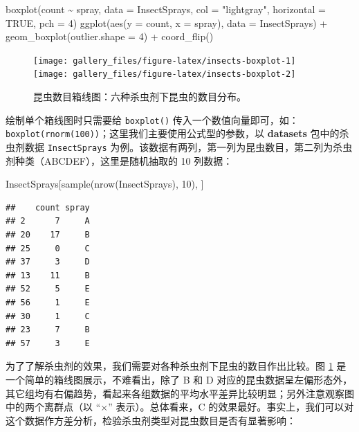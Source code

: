 \documentclass[
  b5paper,
  UTF8,twoside]{book}
\newenvironment{Shaded}{\begin{snugshade}}{\end{snugshade}}
\newcommand{\AttributeTok}[1]{\textcolor[rgb]{0.77,0.63,0.00}{#1}}
\newcommand{\ConstantTok}[1]{\textcolor[rgb]{0.00,0.00,0.00}{#1}}
\newcommand{\DecValTok}[1]{\textcolor[rgb]{0.00,0.00,0.81}{#1}}
\newcommand{\FunctionTok}[1]{\textcolor[rgb]{0.00,0.00,0.00}{#1}}
\newcommand{\NormalTok}[1]{#1}
\newcommand{\SpecialCharTok}[1]{\textcolor[rgb]{0.00,0.00,0.00}{#1}}
\newcommand{\StringTok}[1]{\textcolor[rgb]{0.31,0.60,0.02}{#1}}
\begin{document}
\begin{Shaded}
\begin{Highlighting}[]
\FunctionTok{boxplot}\NormalTok{(count }\SpecialCharTok{\textasciitilde{}}\NormalTok{ spray, }\AttributeTok{data =}\NormalTok{ InsectSprays,}
        \AttributeTok{col =} \StringTok{"lightgray"}\NormalTok{, }\AttributeTok{horizontal =} \ConstantTok{TRUE}\NormalTok{, }\AttributeTok{pch =} \DecValTok{4}\NormalTok{)}
\FunctionTok{ggplot}\NormalTok{(}\FunctionTok{aes}\NormalTok{(}\AttributeTok{y =}\NormalTok{ count, }\AttributeTok{x =}\NormalTok{ spray), }\AttributeTok{data =}\NormalTok{ InsectSprays) }\SpecialCharTok{+}
  \FunctionTok{geom\_boxplot}\NormalTok{(}\AttributeTok{outlier.shape =} \DecValTok{4}\NormalTok{) }\SpecialCharTok{+}
  \FunctionTok{coord\_flip}\NormalTok{()}
\end{Highlighting}
\end{Shaded}

\begin{figure}

{\centering \texttt{[image: gallery\_files/figure-latex/insects-boxplot-1]} \texttt{[image: gallery\_files/figure-latex/insects-boxplot-2]} 

}

\caption[各种杀虫剂下昆虫数目的箱线图]{昆虫数目箱线图：六种杀虫剂下昆虫的数目分布。}\label{fig:insects-boxplot}
\end{figure}

绘制单个箱线图时只需要给 \texttt{boxplot()} 传入一个数值向量即可，如：\texttt{boxplot(rnorm(100))}；这里我们主要使用公式型的参数，以 \textbf{datasets} 包中的杀虫剂数据 \texttt{InsectSprays} 为例。该数据有两列，第一列为昆虫数目，第二列为杀虫剂种类（ABCDEF），这里是随机抽取的 10 列数据：

\begin{Shaded}
\begin{Highlighting}[]
\NormalTok{InsectSprays[}\FunctionTok{sample}\NormalTok{(}\FunctionTok{nrow}\NormalTok{(InsectSprays), }\DecValTok{10}\NormalTok{), ]}
\end{Highlighting}
\end{Shaded}

\begin{verbatim}
##    count spray
## 2      7     A
## 20    17     B
## 25     0     C
## 37     3     D
## 13    11     B
## 52     5     E
## 56     1     E
## 30     1     C
## 23     7     B
## 57     3     E
\end{verbatim}

为了了解杀虫剂的效果，我们需要对各种杀虫剂下昆虫的数目作出比较。图 \ref{fig:insects-boxplot} 是一个简单的箱线图展示，不难看出，除了 B 和 D 对应的昆虫数据呈左偏形态外，其它组均有右偏趋势，看起来各组数据的平均水平差异比较明显；另外注意观察图中的两个离群点（以 ``\(\times\)'' 表示）。总体看来，C 的效果最好。事实上，我们可以对这个数据作方差分析，检验杀虫剂类型对昆虫数目是否有显著影响：
\end{document}
